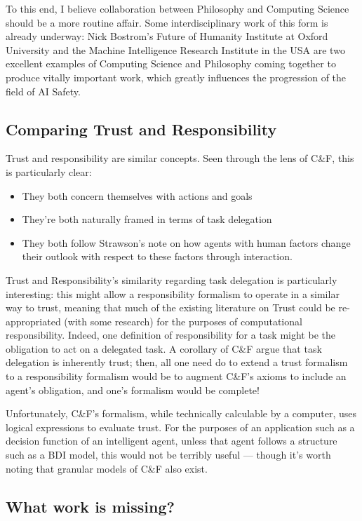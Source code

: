 To this end, I believe collaboration between Philosophy and Computing Science should be a more routine affair. Some interdisciplinary work of this form is already underway: Nick Bostrom's Future of Humanity Institute at Oxford University and the Machine Intelligence Research Institute in the USA are two excellent examples of Computing Science and Philosophy coming together to produce vitally important work, which greatly influences the progression of the field of AI Safety.\par


\subsection{Comparing Trust and Responsibility}
Trust and responsibility are similar concepts. Seen through the lens of C\&F, this is particularly clear: 

\begin{itemize}
    \item They both concern themselves with actions and goals
    \item They're both naturally framed in terms of task delegation
    \item They both follow Strawson's note on how agents with human factors change their outlook with respect to these factors through interaction.
\end{itemize}

Trust and Responsibility's similarity regarding task delegation is particularly interesting: this might allow a responsibility formalism to operate in a similar way to trust, meaning that much of the existing literature on Trust could be re-appropriated (with some research) for the purposes of computational responsibility. Indeed, one definition of responsibility for a task might be the obligation to act on a delegated task. A corollary of C\&F argue that task delegation is inherently trust; then, all one need do to extend a trust formalism to a responsibility formalism would be to augment C\&F's axioms to include an agent's obligation, and one's formalism would be complete!\par

Unfortunately, C\&F's formalism, while technically calculable by a computer, uses logical expressions to evaluate trust. For the purposes of an application such as a decision function of an intelligent agent, unless that agent follows a structure such as a BDI model, this would not be terribly useful --- though it's worth noting that granular models of C\&F also exist\cite{}.



\subsection{What work is missing?}

